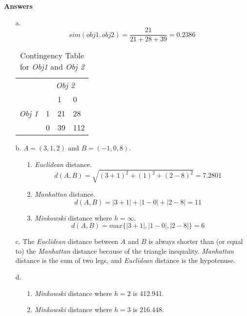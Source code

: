 \textbf{Answers} 
\begin{itemize}
 \item[a.] 
 \[
 sim(obj1,obj2) = \frac{21}{21+28+39} = 0.2386
\]
\begin{table}[h]
\centering

\begin{tabular}{llll}
                                                  & \multicolumn{3}{c}{{\it Obj 2}}                                             \\ \cline{2-4} 
\multicolumn{1}{l|}{\multirow{3}{*}{{\it Obj 1}}} & \multicolumn{1}{l|}{}  & \multicolumn{1}{l|}{1}  & \multicolumn{1}{l|}{0}   \\ \cline{2-4} 
\multicolumn{1}{l|}{}                             & \multicolumn{1}{l|}{1} & \multicolumn{1}{l|}{21} & \multicolumn{1}{l|}{28}  \\ \cline{2-4} 
\multicolumn{1}{l|}{}                             & \multicolumn{1}{l|}{0} & \multicolumn{1}{l|}{39} & \multicolumn{1}{l|}{112} \\ \cline{2-4} 
\end{tabular}
\caption{Contingency Table for \textit{Obj1} and \textit{Obj 2}}
\label{contin}
\end{table}


\item[b.]$A = (3,1,2)$ and $B = (-1,0,8)$. 
 \begin{itemize}
 \item[1.] \textit{Euclidean} distance. 
 \[
 d(A,B) = \sqrt{(3+1)^2+(1)^2+(2-8)^2} = 7.2801
 \]
 \item[2.] \textit{Manhattan} distance.
\[
d(A,B) = |3+1|+|1-0| + |2-8| = 11
\] 
 
 \item[3.]\textit{Minkowski} distance where $h = \infty$.
\[ 
 d(A,B) = max\{|3+1|,|1-0|,|2-8|\} =6
 \]
 \end{itemize} 
 \item[c.] The \textit{Euclidean} distance between $A$ and $B$ is always shorter than (or equal to) the \textit{Manhattan} distance because of the triangle inequality. \textit{Manhattan} distance is the sum of two legs, and \textit{Euclidean} distance is the hypotenuse.
 
 \item[d.] 
 \begin{itemize}
  \item[1.] \textit{Minkowski} distance where $h = 2$ is 412.941.
  \item[2.] \textit{Minkowski} distance where $h = 3$ is 216.448.
  \end{itemize}
 \end{itemize}